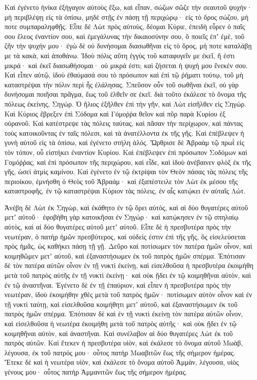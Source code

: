 {\par }{\PP {}Καὶ ἐγένετο ἡνίκα ἐξήγαγον αὐτοὺς ἔξω, καὶ εἶπαν, σώζων σῶζε τὴν σεαυτοῦ ψυχήν· μὴ περιβλέψῃ εἰς τὰ ὀπίσω, μηδὲ στῇς ἐν πάσῃ τῇ περιχώρῳ· εἰς τὸ ὄρος σώζου, μή ποτε συμπαραληφθῇς.
Εἶπε δὲ Λὼτ πρὸς αὐτοὺς, δέομαι
Κύριε, ἐπειδὴ εὗρεν ὁ παῖς σου ἔλεος ἐναντίον σου, καὶ ἐμεγάλυνας τὴν δικαιοσύνην σου, ὃ ποιεῖς ἐπʼ ἐμὲ, τοῦ ζῆν τὴν ψυχήν μου· ἐγὼ δὲ οὐ δυνήσομαι διασωθῆναι εἰς τὸ ὄρος, μή ποτε καταλάβῃ με τὰ κακὰ, καὶ ἀποθάνω.
Ἰδοὺ πόλις αὕτη ἐγγὺς τοῦ καταφυγεῖν με ἐκεῖ, ἥ ἐστι μικρά· καὶ ἐκεῖ διασωθήσομαι· οὐ μικρά ἐστι; καὶ ζήσεται ἡ ψυχή μου ἕνεκέν σου.
Καὶ εἶπεν αὐτῷ, ἰδοὺ ἐθαύμασά σου τὸ πρόσωπον καὶ ἐπὶ τῷ ῥήματι τούτῳ, τοῦ μὴ καταστρέψαι τὴν πόλιν περὶ ἧς ἐλάλησας.
Σπεῦσον οὖν τοῦ σωθῆναι ἐκεῖ, οὐ γὰρ δυνήσομαι ποιῆσαι πρᾶγμα, ἕως τοῦ ἐλθεῖν σε ἐκεῖ. διὰ τοῦτο ἐκάλεσε τὸ ὄνομα τῆς πόλεως ἐκείνης, Σηγώρ.
Ὁ ἥλιος ἐξῆλθεν ἐπὶ τὴν γῆν, καὶ Λὼτ εἰσῆλθεν εἰς Σηγώρ.
Καὶ Κύριος ἔβρεξεν ἐπὶ Σόδομα καὶ Γόμοῤῥα θεῖον καὶ πῦρ παρὰ Κυρίου ἐξ οὐρανοῦ.
Καὶ κατέστρεψε τὰς πόλεις ταύτας, καὶ πᾶσαν τὴν περίχωρον, καὶ πάντας τοὺς κατοικοῦντας ἐν ταῖς πόλεσι, καὶ τὰ ἀνατέλλοντα ἐκ τῆς γῆς.
Καὶ ἐπέβλεψεν ἡ γυνὴ αὐτοῦ εἰς τὰ ὀπίσω, καὶ ἐγένετο στήλη ἁλός.
Ὤρθρισε δὲ Ἁβραὰμ τῷ πρωῒ εἰς τὸν τόπον, οὗ εἱστήκει ἐναντίον Κυρίου.
Καὶ ἐπέβλεψεν ἐπὶ πρόσωπον Σοδόμων καὶ Γομόῤῥας, καὶ ἐπὶ πρόσωπον τῆς περιχώρου, καὶ εἶδε, καὶ ἰδοὺ ἀνέβαινεν φλὸξ ἐκ τῆς γῆς, ὡσεὶ ἀτμὶς καμίνου.
Καὶ ἐγένετο ἐν τῷ ἐκτρίψαι τὸν Θεὸν πάσας τὰς πόλεις τῆς περιοίκου, ἐμνήσθη ὁ Θεὸς τοῦ Ἁβραάμ· καὶ ἐξαπέστειλε τὸν Λὼτ ἐκ μέσου τῆς καταστροφῆς, ἐν τῷ καταστρέψαι Κύριον τὰς πόλεις, ἐν αἷς κατῴκει ἐν αὐταῖς Λώτ.
\par }{\PP {}Ἀνέβη δὲ Λὼτ ἐκ Σηγὼρ, καὶ ἐκάθητο ἐν τῷ ὄρει αὐτὸς, καὶ αἱ δύο θυγατέρες αὐτοῦ μετʼ αὐτοῦ· ἐφοβήθη γὰρ κατοικῆσαι ἐν Σηγώρ· καὶ κατῴκησεν ἐν τῷ σπηλαίῳ αὐτὸς, καὶ αἱ δύο θυγατέρες αὐτοῦ μετʼ αὐτοῦ.
Εἶπε δὲ ἡ πρεσβυτέρα πρὸς τὴν νεωτέραν, ὁ πατὴρ ἡμῶν πρεσβύτερος, καὶ οὐδείς ἐστιν ἐπὶ τῆς γῆς, ὃς εἰσελεύσεται πρὸς ἡμᾶς, ὡς καθήκει πάσῃ τῇ γῇ.
Δεῦρο καὶ ποτίσωμεν τὸν πατέρα ἡμῶν οἶνον, καὶ κοιμηθῶμεν μετʼ αὐτοῦ, καὶ ἐξαναστήσωμεν ἐκ τοῦ πατρὸς ἡμῶν σπέρμα.
Ἐπότισαν δὲ τὸν πατέρα αὐτῶν οἶνον ἐν τῇ νυκτὶ ἐκείνῃ, καὶ εἰσελθοῦσα ἡ πρεσβυτέρα ἐκοιμήθη μετὰ τοῦ πατρὸς αὐτῆς ἐν τῇ νυκτὶ ἐκείνῃ· καὶ οὐκ ᾔδει ἐν τῷ κοιμηθῆναι αὐτὸν, καὶ ἐν τῷ ἀναστῆναι.
Ἐγένετο δὲ ἐν τῇ ἐπαύριον, καὶ εἶπεν ἡ πρεσβυτέρα πρὸς τὴν νεωτέραν, ἰδοὺ ἐκοιμήθην χθὲς μετὰ τοῦ πατρὸς ἡμῶν· ποτίσωμεν αὐτὸν οἶνον καὶ ἐν τῇ νυκτὶ ταύτῃ, καὶ εἰσελθοῦσα κοιμήθητι μετʼ αὐτοῦ, καὶ ἐξαναστήσωμεν ἐκ τοῦ πατρὸς ἡμῶν σπέρμα.
Ἐπότισαν δὲ καὶ ἐν τῇ νυκτὶ ἐκείνῃ τὸν πατέρα αὐτῶν οἶνον, καὶ εἰσελθοῦσα ἡ νεωτέρα ἐκοιμήθη μετὰ τοῦ πατρὸς αὐτῆς· καὶ οὐκ ᾔδει ἐν τῷ κοιμηθῆναι αὐτὸν, καὶ ἀναστῆναι.
Καὶ συνέλαβον αἱ δύο θυγατέρες Λὼτ ἐκ τοῦ πατρὸς αὐτῶν.
Καὶ ἔτεκεν ἡ πρεσβυτέρα υἱὸν, καὶ ἐκάλεσε τὸ ὄνομα αὐτοῦ Μωὰβ, λέγουσα, ἐκ τοῦ πατρός μου· οὗτος πατὴρ Μωαβιτῶν ἕως τῆς σήμερον ἡμέρας.
Ἔτεκε δὲ καὶ ἡ νεωτέρα υἱὸν, καὶ ἐκάλεσε τὸ ὄνομα αὐτοῦ Ἀμμὰν, λέγουσα, υἱὸς γένους μου· οὗτος πατὴρ Ἀμμανιτῶν ἕως τῆς σήμερον ἡμέρας.

}
